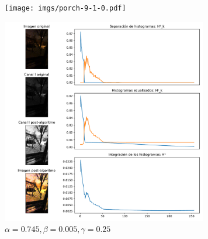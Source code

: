 \begin{figure}[H]
\begin{minipage}[c]{0.48\linewidth}
  \texttt{[image: imgs/porch-9-1-0.pdf]}
  \caption{$\alpha = 0.9, \beta = 0.1, \gamma = 0$}
\end{minipage}
\hfill
\begin{minipage}[c]{0.48\linewidth}
  \includegraphics[height=9cm]{imgs/porch-745-005-25.pdf}
  \caption{$\alpha = 0.745, \beta = 0.005, \gamma = 0.25$}
\end{minipage}%
\end{figure}

